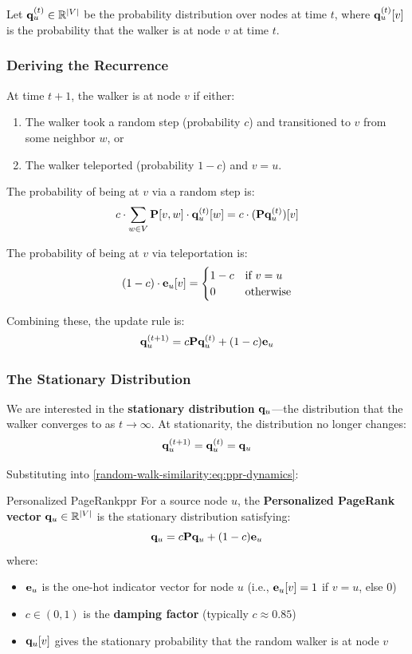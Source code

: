 \begin{notechapter}
Let $\mathbf{q}_u^{(t)} \in \mathbb{R}^{|V|}$ be the probability distribution over nodes at time $t$, where $\mathbf{q}_u^{(t)}[v]$ is the probability that the walker is at node $v$ at time $t$.

\subsubsection*{Deriving the Recurrence}

At time $t+1$, the walker is at node $v$ if either:
\begin{enumerate}
    \item The walker took a random step (probability $c$) and transitioned to $v$ from some neighbor $w$, or
    \item The walker teleported (probability $1-c$) and $v = u$.
\end{enumerate}

The probability of being at $v$ via a random step is:
\[
c \cdot \sum_{w \in V} \mathbf{P}[v, w] \cdot \mathbf{q}_u^{(t)}[w] = c \cdot (\mathbf{P} \mathbf{q}_u^{(t)})[v]
\]

The probability of being at $v$ via teleportation is:
\[
(1-c) \cdot \mathbf{e}_u[v] = \begin{cases} 1-c & \text{if } v = u \\ 0 & \text{otherwise} \end{cases}
\]

Combining these, the update rule is:
\begin{equation}
\mathbf{q}_u^{(t+1)} = c \mathbf{P} \mathbf{q}_u^{(t)} + (1-c) \mathbf{e}_u
\label{random-walk-similarity:eq:ppr-dynamics}
\end{equation}

\subsubsection*{The Stationary Distribution}

We are interested in the \textbf{stationary distribution} $\mathbf{q}_u$---the distribution that the walker converges to as $t \to \infty$. At stationarity, the distribution no longer changes:
\[
\mathbf{q}_u^{(t+1)} = \mathbf{q}_u^{(t)} = \mathbf{q}_u
\]

Substituting into \cref{random-walk-similarity:eq:ppr-dynamics}:

\begin{definition}{Personalized PageRank}{ppr}
For a source node $u$, the \textbf{Personalized PageRank vector} $\mathbf{q}_u \in \mathbb{R}^{|V|}$ is the stationary distribution satisfying:
\begin{equation}
\mathbf{q}_u = c \mathbf{P} \mathbf{q}_u + (1 - c) \mathbf{e}_u
\label{random-walk-similarity:eq:ppr-recurrence}
\end{equation}
where:
\begin{itemize}
    \item $\mathbf{e}_u$ is the one-hot indicator vector for node $u$ (i.e., $\mathbf{e}_u[v] = 1$ if $v = u$, else 0)
    \item $c \in (0, 1)$ is the \textbf{damping factor} (typically $c \approx 0.85$)
    \item $\mathbf{q}_u[v]$ gives the stationary probability that the random walker is at node $v$
\end{itemize}
\end{definition}


\end{notechapter}
